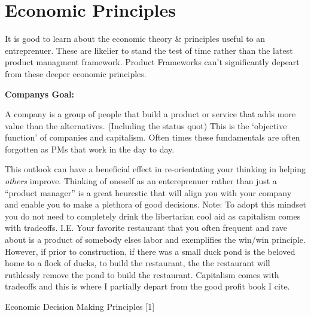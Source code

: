 \documentclass[
  letterpaper,
  DIV=11,
  numbers=noendperiod]{scrreprt}
\begin{document}

\hypertarget{economic-principles}{%
\chapter{Economic Principles}\label{economic-principles}}

It is good to learn about the economic theory \& principles useful to an
entreprenuer. These are likelier to stand the test of time rather than
the latest product managment framework. Product Frameworks can't
significantly depeart from these deeper economic principles.

\textbf{Companys Goal:}

A company is a group of people that build a product or service that adds
more value than the alternatives. (Including the status quot) This is
the `objective function' of companies and capitalism. Often times these
fundamentals are often forgotten as PMs that work in the day to day.

This outlook can have a beneficial effect in re-orientating your
thinking in helping \emph{others} improve. Thinking of oneself as an
entereprenuer rather than just a ``product manager'' is a great
heurestic that will align you with your company and enable you to make a
plethora of good decisions. Note: To adopt this mindset you do not need
to completely drink the libertarian cool aid as capitalism comes with
tradeoffs. I.E. Your favorite restaurant that you often frequent and
rave about is a product of somebody elses labor and exemplifies the
win/win principle. However, if prior to construction, if there was a
small duck pond is the beloved home to a flock of ducks, to build the
restaurant, the the restaurant will ruthlessly remove the pond to build
the restaurant. Capitalism comes with tradeoffs and this is where I
partially depart from the good profit book I cite.

Economic Decision Making Principles {[}1{]}
\end{document}
